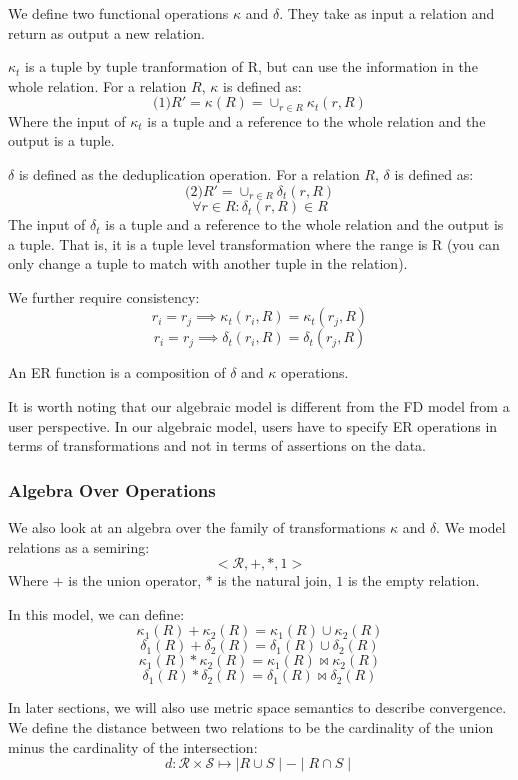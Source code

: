 \begin{definition}
We define two functional operations $\kappa$ and $\delta$.
They take as input a relation and return as output a new relation.

$\kappa_t$ is a tuple by tuple tranformation of R, but can use the information in the whole relation.
For a relation $R$, $\kappa$ is defined as:
\[
\text{(1)}  R' = \kappa(R) = \cup_{r \in R} \kappa_t(r,R)
\]
Where the input of $\kappa_t$ is a tuple and a reference to the whole relation
and the output is a tuple.

$\delta$ is defined as the deduplication operation.
For a relation $R$, $\delta$ is defined as:
\[
\text{(2)}  R' = \cup_{r \in R} \delta_t(r,R)
\]
\[
\forall r \in R: \delta_t(r,R) \in R
\]
The input of $\delta_t$ is a tuple and a reference to the whole relation
and the output is a tuple.
That is, it is a tuple level transformation where the range is R (you can only change a tuple to match with another tuple in the relation).

We further require consistency:
\[
r_i = r_j \implies \kappa_t(r_i,R) = \kappa_t(r_j,R)
\]
\[
r_i = r_j \implies \delta_t(r_i,R) = \delta_t(r_j,R)
\]

An ER function is a composition of $\delta$ and $\kappa$ operations.
\end{definition}

It is worth noting that our algebraic model is different from the FD model from a user perspective.
In our algebraic model, users have to specify ER operations in terms of transformations and not in terms of assertions on the data.

\subsubsection{Algebra Over Operations}
We also look at an algebra over the family of transformations $\kappa$ and $\delta$.
We model relations as a semiring:
\[ <\mathcal{R}, +, *, 1>\]
Where $+$ is the union operator, $*$ is the natural join, $1$ is the empty relation.

In this model, we can define:
\[
\kappa_1(R) + \kappa_2(R) = \kappa_1(R) \cup \kappa_2(R)
\]
\[
\delta _1(R) + \delta_2(R) = \delta_1(R) \cup \delta_2(R)
\]
\[
\kappa_1(R) * \kappa_2(R) = \kappa_1(R) \bowtie \kappa_2(R)
\]
\[
\delta_1(R) * \delta_2(R) = \delta_1(R) \bowtie \delta_2(R)
\]

In later sections, we will also use metric space semantics to describe convergence.
We define the distance between two relations to be the cardinality of the union minus the cardinality of the intersection:
\[ d:\mathcal{R} \times \mathcal{S} \mapsto \mid R \cup S \mid - \mid R \cap S \mid\]










